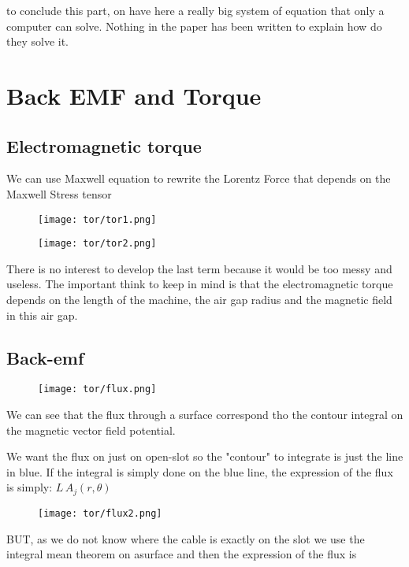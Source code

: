 to conclude this part, on have here a really big system of equation that only a computer can solve. Nothing in the paper has been written to explain how do they solve it.

\section{Back EMF and Torque}
\subsection{Electromagnetic torque}
We can use Maxwell equation to rewrite the Lorentz Force that depends on the Maxwell Stress tensor
\begin{figure}[H]
    \centering
    \texttt{[image: tor/tor1.png]}
\end{figure}
\begin{figure}[H]
    \centering
    \texttt{[image: tor/tor2.png]}
\end{figure}

There is no interest to develop the last term because it would be too messy and useless. The important think to keep in mind is that the electromagnetic torque depends on the length of the machine, the air gap radius and the magnetic field in this air gap.

\subsection{Back-emf}
\begin{figure}[H]
    \centering
    \texttt{[image: tor/flux.png]}
\end{figure}
We can see that the flux through a surface correspond tho the contour integral on the magnetic vector field potential. 

\begin{minipage}{0.55\linewidth}
We want the flux on just on open-slot so the "contour" to integrate is just the line in blue. If the integral is simply done on the blue line, the expression of the flux is simply: $L \, A_{j}(r, \theta)$
\end{minipage}\hfill
\begin{minipage}{0.4\linewidth}
\begin{figure}[H]
    \texttt{[image: tor/flux2.png]}
\end{figure}
\end{minipage}

BUT, as we do not know where the cable is exactly on the slot we use the integral mean theorem  on asurface and then the expression of the flux is 


